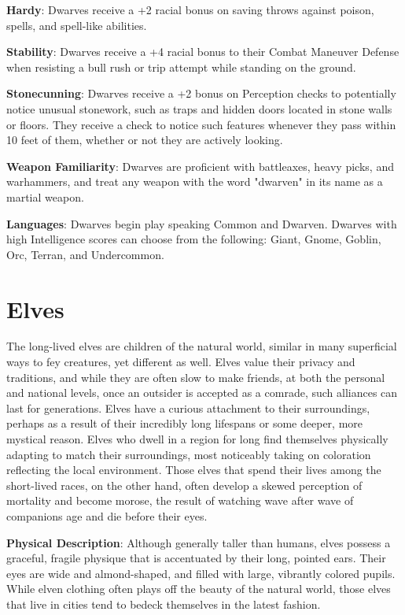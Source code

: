 \textbf{Hardy}: Dwarves receive a +2 racial bonus on saving throws against poison, spells, and spell-like abilities.
				
\textbf{Stability}: Dwarves receive a +4 racial bonus to their Combat Maneuver Defense when resisting a bull rush or trip attempt while standing on the ground.
				
\textbf{Stonecunning}: Dwarves receive a +2 bonus on Perception checks to potentially notice unusual stonework, such as traps and hidden doors located in stone walls or floors. They receive a check to notice such features whenever they pass within 10 feet of them, whether or not they are actively looking. 
				
\textbf{Weapon Familiarity}: Dwarves are proficient with battleaxes, heavy picks, and warhammers, and treat any weapon with the word "dwarven" in its name as a martial weapon.
				
\textbf{Languages}: Dwarves begin play speaking Common and Dwarven. Dwarves with high Intelligence scores can choose from the following: Giant, Gnome, Goblin, Orc, Terran, and Undercommon.
							
\section{Elves}

				
The long-lived elves are children of the natural world, similar in many superficial ways to fey creatures, yet different as well. Elves value their privacy and traditions, and while they are often slow to make friends, at both the personal and national levels, once an outsider is accepted as a comrade, such alliances can last for generations. Elves have a curious attachment to their surroundings, perhaps as a result of their incredibly long lifespans or some deeper, more mystical reason. Elves who dwell in a region for long find themselves physically adapting to match their surroundings, most noticeably taking on coloration reflecting the local environment. Those elves that spend their lives among the short-lived races, on the other hand, often develop a skewed perception of mortality and become morose, the result of watching wave after wave of companions age and die before their eyes.
				
\textbf{Physical Description}: Although generally taller than humans, elves possess a graceful, fragile physique that is accentuated by their long, pointed ears. Their eyes are wide and almond-shaped, and filled with large, vibrantly colored pupils. While elven clothing often plays off the beauty of the natural world, those elves that live in cities tend to bedeck themselves in the latest fashion.
				
